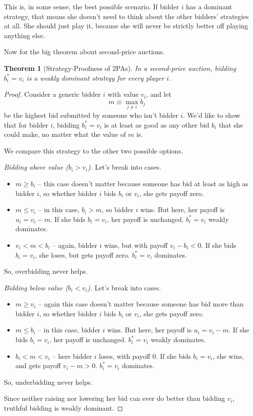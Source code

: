 \documentclass[12pt]{article}
\newtheorem{theorem}{Theorem}
\theoremstyle{definition}
\theoremstyle{remark}
\theoremstyle{plain}                          %
\begin{document}
This is, in some sense, the best possible scenario. If bidder $i$ has a dominant strategy, that means she doesn't need to think about the other bidders' strategies at all. She should just play it, because she will never be strictly better off playing anything else.

Now for the big theorem about second-price auctions.

\begin{theorem}[Strategy-Proofness of 2PAs]\label{thm:vickrey}
In a second-price auction, bidding $b_i^*=v_i$ is a weakly dominant strategy for every player $i$.
\end{theorem}

\begin{proof}
Consider a generic bidder $i$ with value $v_i$, and let
\[
  m \equiv \max_{j \ne i} b_j
\]
be the highest bid submitted by someone who isn't bidder $i$. We'd like to show that for bidder $i$, bidding $b_i^*=v_i$ is at least as good as any other bid $b_i$ that she could make, no matter what the value of $m$ is.

We compare this strategy to the other two possible options.

\medskip
\noindent\emph{Bidding above value ($b_i > v_i$).} Let's break into cases.
\begin{itemize}[nosep]
    \item $m \geq b_i$ -- this case doesn't matter because someone has bid at least as high as bidder $i$, so whether bidder $i$ bids $b_i$ or $v_i$, she gets payoff zero.
    \item $m \leq v_i$ -- in this case, $b_i > m$, so bidder $i$ wins. But here, her payoff is $u_i=v_i-m$. If she bids $b_i=v_i$, her payoff is unchanged. $b_i^*=v_i$ weakly dominates.
    \item $v_i<m<b_i$ -- again, bidder $i$ wins, but with payoff $v_i-b_i<0$. If she bids $b_i=v_i$, she loses, but gets payoff zero. $b_i^*=v_i$ dominates.
\end{itemize} So, overbidding never helps.

\medskip
\noindent\emph{Bidding below value ($b_i < v_i$).} Let's break into cases.
\begin{itemize}[nosep]
    \item $m \geq v_i$ -- again this case doesn't matter because someone has bid more than bidder $i$, so whether bidder $i$ bids $b_i$ or $v_i$, she gets payoff zero.
    \item $m \leq b_i$ -- in this case, bidder $i$ wins. But here, her payoff is $u_i=v_i-m$. If she bids $b_i=v_i$, her payoff is unchanged. $b_i^*=v_i$ weakly dominates.
    \item $b_i<m<v_i$ -- here bidder $i$ loses, with payoff $0$. If she bids $b_i=v_i$, she wins, and gets payoff $v_i-m>0$. $b_i^*=v_i$ dominates.
\end{itemize} So, underbidding never helps.

\medskip
Since neither raising nor lowering her bid can ever do better than bidding $v_i$,
truthful bidding is weakly dominant.
\end{proof}
\end{document}
